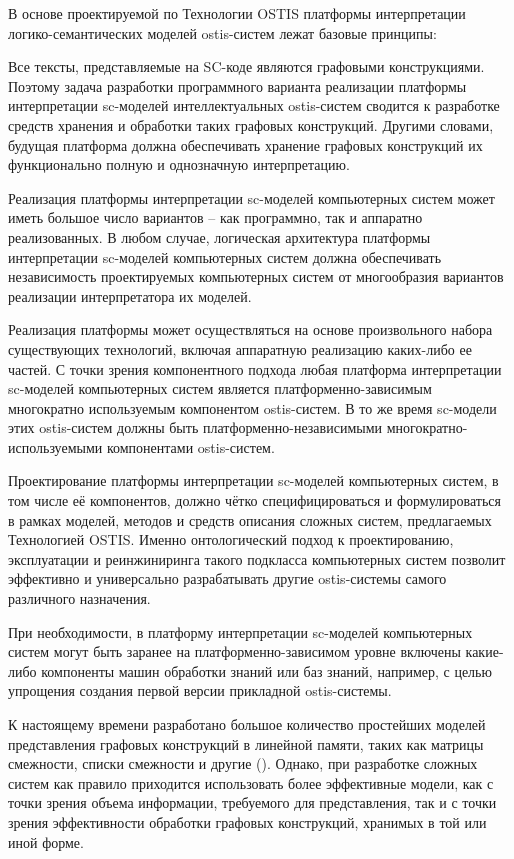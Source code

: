 В основе проектируемой по Технологии OSTIS платформы интерпретации логико-семантических моделей ostis-систем лежат
базовые принципы:
\begin{scnitemize}
    \item Все тексты, представляемые на SC-коде являются графовыми конструкциями. Поэтому задача разработки
    программного варианта реализации платформы интерпретации sc-моделей интеллектуальных ostis-систем сводится к разработке средств
    хранения и обработки таких графовых конструкций. Другими словами, будущая платформа должна обеспечивать хранение графовых
    конструкций их функционально полную и однозначную интерпретацию.
    \item Реализация платформы интерпретации sc-моделей компьютерных систем может иметь большое число вариантов – как
    программно, так и аппаратно реализованных. В любом случае, логическая архитектура платформы интерпретации sc-моделей
    компьютерных систем должна обеспечивать независимость проектируемых компьютерных систем от многообразия вариантов
    реализации интерпретатора их моделей.
    \item Реализация платформы может осуществляться на основе произвольного набора существующих технологий, включая
    аппаратную реализацию каких-либо ее частей. С точки зрения компонентного подхода любая платформа интерпретации
    sc-моделей компьютерных систем является платформенно-зависимым многократно используемым компонентом ostis-систем.
    В то же время sc-модели этих ostis-систем должны быть платформенно-независимыми многократно-используемыми компонентами
    ostis-систем.
    \item Проектирование платформы интерпретации sc-моделей компьютерных систем, в том числе её компонентов, должно
    чётко специфицироваться и формулироваться в рамках моделей, методов и средств описания сложных систем, предлагаемых
    Технологией OSTIS. Именно онтологический подход к проектированию, эксплуатации и реинжиниринга такого подкласса
    компьютерных систем позволит эффективно и универсально разрабатывать другие ostis-системы самого различного
    назначения.
\end{scnitemize}

При необходимости, в платформу интерпретации sc-моделей компьютерных систем могут быть заранее на платформенно-зависимом
уровне включены какие-либо компоненты машин обработки знаний или баз знаний, например, с целью упрощения создания первой
версии прикладной ostis-системы.

К настоящему времени разработано большое количество простейших моделей представления графовых конструкций в линейной
памяти, таких как матрицы смежности, списки смежности и другие (). Однако, при разработке сложных
систем как правило приходится использовать более эффективные модели, как с точки зрения объема информации, требуемого
для представления, так и с точки зрения эффективности обработки графовых конструкций, хранимых в той или иной форме.

